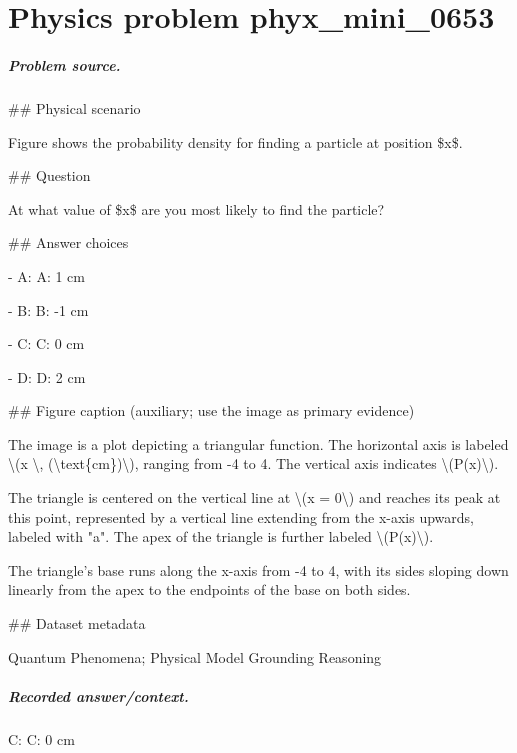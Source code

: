 
\chapter{Physics problem phyx\_mini\_0653}
\label{ch:PhyXMiniProblems_problem_phyx_mini_0653}

\paragraph{Problem source.}
\#\# Physical scenario

Figure shows the probability density for finding a particle at position \$x\$.

\#\# Question

At what value of \$x\$ are you most likely to find the particle?

\#\# Answer choices

- A: A: 1 cm

- B: B: -1 cm

- C: C: 0 cm

- D: D: 2 cm

\#\# Figure caption (auxiliary; use the image as primary evidence)

The image is a plot depicting a triangular function. The horizontal axis is labeled \textbackslash{}(x \textbackslash{}, (\textbackslash{}text\{cm\})\textbackslash{}), ranging from -4 to 4. The vertical axis indicates \textbackslash{}(P(x)\textbackslash{}).

The triangle is centered on the vertical line at \textbackslash{}(x = 0\textbackslash{}) and reaches its peak at this point, represented by a vertical line extending from the x-axis upwards, labeled with "a". The apex of the triangle is further labeled \textbackslash{}(P(x)\textbackslash{}).

The triangle's base runs along the x-axis from -4 to 4, with its sides sloping down linearly from the apex to the endpoints of the base on both sides.

\#\# Dataset metadata

Quantum Phenomena; Physical Model Grounding Reasoning

\paragraph{Recorded answer/context.}
C: C: 0 cm

